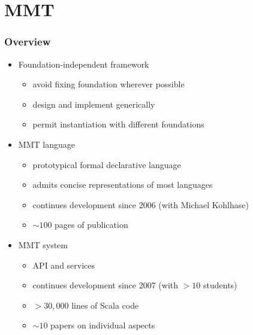 \documentclass{beamer}
\begin{document}
\section{MMT}

\begin{frame}\frametitle{Overview}
\begin{itemize}
\item Foundation-independent framework
  \begin{itemize}
    \item avoid fixing foundation wherever possible
    \item design and implement generically
    \item permit instantiation with different foundations
  \end{itemize}
\item MMT language
   \begin{itemize}
     \item prototypical formal declarative language
     \item admits concise representations of most languages
     \item continues development since 2006 (with Michael Kohlhase)
     \item $\sim 100$ pages of publication
   \end{itemize}
\item MMT system
   \begin{itemize}
     \item API and services
     \item continues development since 2007 (with $>10$ students)
     \item $>30,000$ lines of Scala code 
     \item $\sim 10$ papers on individual aspects
   \end{itemize}
\end{itemize}
\end{frame}
\end{document}
